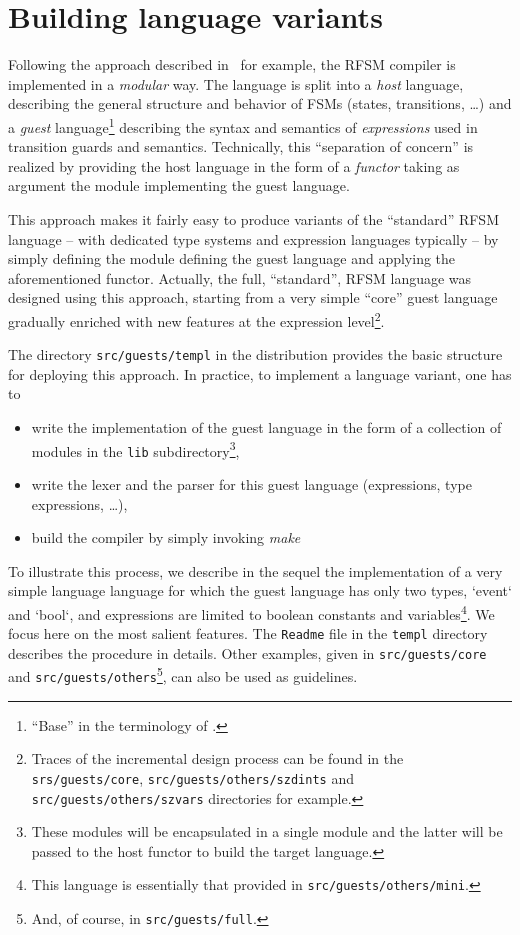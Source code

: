 \chapter{ Building language variants}
\label{cha:variants}

Following the approach described in~\cite{Leroy00} for example, the RFSM compiler is implemented in
a \emph{modular} way. The language is split into a \emph{host} language, describing the general
structure and behavior of FSMs (states, transitions, \ldots) and a \emph{guest}
language\footnote{``Base'' in the terminology of \cite{Leroy00}.} describing the syntax and
semantics of \emph{expressions} used in transition guards and semantics. 
Technically, this ``separation of concern'' is realized by providing the host language in the form
of a \emph{functor} taking as argument the module implementing the guest language.

This approach makes it fairly easy to produce variants of the ``standard'' RFSM language -- with
dedicated type systems and expression languages typically -- by simply defining the module defining
the guest language and applying the aforementioned functor. Actually, the full, ``standard'', RFSM
  language was designed using this approach, starting from a very simple ``core'' guest
  language gradually enriched with new features at the expression level\footnote{Traces of the
    incremental design process can be found in the \texttt{srs/guests/core},
    \texttt{src/guests/others/szdints} and \texttt{src/guests/others/szvars} directories for example.}. 

The directory \verb|src/guests/templ| in the distribution provides the basic structure for deploying
this approach. In practice, to implement a language variant, one has to
\begin{itemize}
\item write the implementation of the guest language in the form of a collection of modules in the
  \texttt{lib} subdirectory\footnote{These modules will be encapsulated in a single module and the
    latter will be passed to the host functor to build the target language.},
\item write the lexer and the parser for this guest language (expressions, type expressions, \ldots),
\item build the compiler by simply invoking \emph{make}  
\end{itemize}

\medskip
To illustrate this process, we describe in the sequel the implementation of a very simple language
language for which the guest language has only two types, `event` and `bool`,
and expressions are limited to boolean constants and variables\footnote{This language is essentially
  that provided in \texttt{src/guests/others/mini}.}. We focus here on the most salient features. 
The \texttt{Readme} file in the  \texttt{templ} directory describes the procedure in
details. Other examples, given in \verb|src/guests/core| and \verb|src/guests/others|\footnote{And, of
  course, in \texttt{src/guests/full}.}, can also be used as guidelines. 

